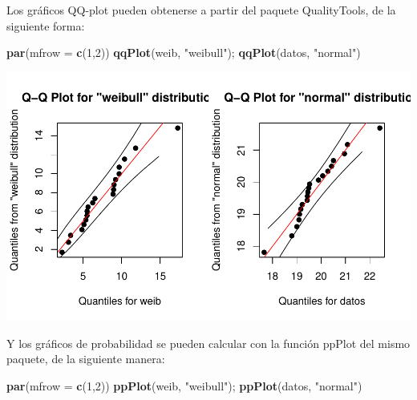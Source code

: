 \documentclass[
]{book}
\newenvironment{Shaded}{\begin{snugshade}}{\end{snugshade}}
\newcommand{\AttributeTok}[1]{\textcolor[rgb]{0.13,0.29,0.53}{#1}}
\newcommand{\DecValTok}[1]{\textcolor[rgb]{0.00,0.00,0.81}{#1}}
\newcommand{\FunctionTok}[1]{\textcolor[rgb]{0.13,0.29,0.53}{\textbf{#1}}}
\newcommand{\NormalTok}[1]{#1}
\newcommand{\StringTok}[1]{\textcolor[rgb]{0.31,0.60,0.02}{#1}}
\begin{document}
Los gráficos QQ-plot pueden obtenerse a partir del paquete QualityTools, de la siguiente forma:

\begin{Shaded}
\begin{Highlighting}[]
\FunctionTok{par}\NormalTok{(}\AttributeTok{mfrow =} \FunctionTok{c}\NormalTok{(}\DecValTok{1}\NormalTok{,}\DecValTok{2}\NormalTok{))}
\FunctionTok{qqPlot}\NormalTok{(weib, }\StringTok{"weibull"}\NormalTok{); }\FunctionTok{qqPlot}\NormalTok{(datos, }\StringTok{"normal"}\NormalTok{)}
\end{Highlighting}
\end{Shaded}

\begin{center}\includegraphics{Libro_TidyQualityTools_files/figure-latex/unnamed-chunk-87-1} \end{center}

Y los gráficos de probabilidad se pueden calcular con la función ppPlot del mismo paquete, de la siguiente manera:

\begin{Shaded}
\begin{Highlighting}[]
\FunctionTok{par}\NormalTok{(}\AttributeTok{mfrow =} \FunctionTok{c}\NormalTok{(}\DecValTok{1}\NormalTok{,}\DecValTok{2}\NormalTok{))}
\FunctionTok{ppPlot}\NormalTok{(weib, }\StringTok{"weibull"}\NormalTok{); }\FunctionTok{ppPlot}\NormalTok{(datos, }\StringTok{"normal"}\NormalTok{)}
\end{Highlighting}
\end{Shaded}
\end{document}
